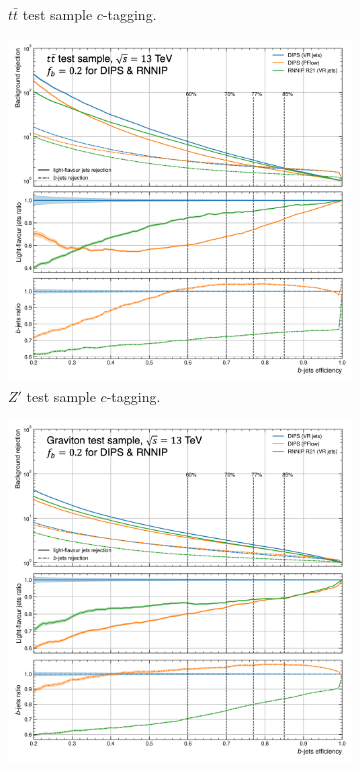 \begin{figure}
\begin{subfigure}[t]{0.3\textwidth}
    \caption{$t\bar{t}$ test sample $c$-tagging.}
    \label{fig:dipsVRROCttc}
  \end{subfigure}
  \hfill
  \begin{subfigure}[t]{0.3\textwidth}
    \centering
    \includegraphics[scale=0.43]{Images/FTAG/VRDips/ROC/zpc.png}
    \caption{$Z'$ test sample $c$-tagging.}
    \label{fig:dipsVRROCzpc}
  \end{subfigure}
  \hfill
  \begin{subfigure}[t]{0.3\textwidth}
    \centering
    \includegraphics[scale=0.43]{Images/FTAG/VRDips/ROC/grc.png}

\end{subfigure}
\end{figure}
